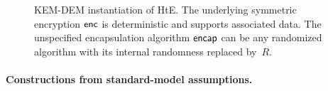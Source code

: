 \begin{figure}[tbhp]
\begin{center}
%
\caption{KEM-DEM instantiation of HtE.  The underlying symmetric encryption ${\mathsf{enc}}$ is deterministic and supports associated data. The unspecified encapsulation algorithm $\mathsf{encap}$ can be any randomized algorithm with its internal randomness replaced by~$R$.  
}
\label{fig:kem-dem-HtE}
\end{center}
\end{figure}

\paragraph{Constructions from standard-model assumptions. } 


